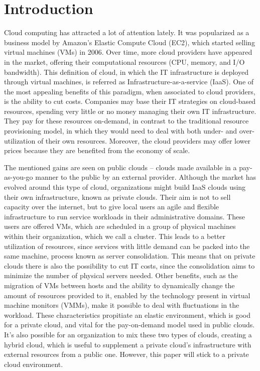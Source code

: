 \chapter{\textbf{Introduction}}

\label{Introduction}

Cloud computing has attracted a lot of attention lately. It was popularized as a business model by Amazon's Elastic Compute Cloud (EC2), which started selling virtual machines (VMs) in 2006. Over time, more cloud providers have appeared in the market, offering their computational resources (CPU, memory, and I/O bandwidth). This definition of cloud, in which the IT infrastructure is deployed through virtual machines, is referred as Infrastructure-as-a-service (IaaS). One of the most appealing benefits of this paradigm, when associated to cloud providers, is the ability to cut costs. Companies may base their IT strategies on cloud-based resources, spending very little or no money managing their own IT infrastructure. They pay for these resources on-demand, in contrast to the traditional resource provisioning model, in which they would need to deal with both under- and over- utilization of their own resources. Moreover, the cloud providers may offer lower prices because they are benefited from the economy of 
scale.


The mentioned gains are seen on public clouds -- clouds made available in a pay-as-you-go manner to the public by an external provider. Although the market has evolved around this type of cloud, organizations might build IaaS clouds using their own infrastructure, known as private clouds. Their aim is not to sell capacity  over the internet,  but to give local users an agile and flexible infrastructure to run service workloads in their administrative domains. These users are offered VMs, which are scheduled in a group of physical machines within their organization, which we call a cluster. This leads to a better utilization of resources, since services with little demand can be packed into the same machine, process known as server consolidation. This means that on private clouds there is also the possibility to cut IT costs, since the consolidation aims to minimize the number of physical servers needed. Other benefits, such as the migration of VMs between hosts and the ability to dynamically change the amount of resources provided to it, enabled by the  technology present in virtual machine monitors (VMMs), make it 
possible to deal with fluctuations in the workload. These characteristics propitiate an elastic environment, which is good for a private cloud, and vital for the pay-on-demand model used in public clouds.  It's also possible for an organization to mix these two types of clouds, creating a hybrid cloud,  which is useful to supplement a private cloud's infrastructure with external resources from a public one. However, this paper will stick to a private cloud environment. 

